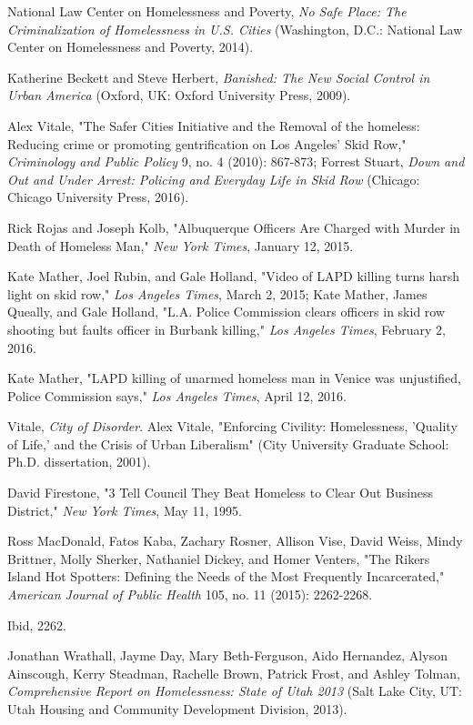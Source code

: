 \documentclass[fontset=fandol, a4paper, 12pt, openright]{ctexbook}
\begin{document}
\begin{enumerate}[label={[\arabic*]}]
    \item National Law Center on Homelessness and Poverty, \textit{No Safe Place: The Criminalization of Homelessness in U.S. Cities} (Washington, D.C.: National Law Center on Homelessness and Poverty, 2014).
    \item Katherine Beckett and Steve Herbert, \textit{Banished: The New Social Control in Urban America} (Oxford, UK: Oxford University Press, 2009).
    \item Alex Vitale, "The Safer Cities Initiative and the Removal of the homeless: Reducing crime or promoting gentrification on Los Angeles' Skid Row," \textit{Criminology and Public Policy} 9, no. 4 (2010): 867-873; Forrest Stuart, \textit{Down and Out and Under Arrest: Policing and Everyday Life in Skid Row} (Chicago: Chicago University Press, 2016).
    \item Rick Rojas and Joseph Kolb, "Albuquerque Officers Are Charged with Murder in Death of Homeless Man," \textit{New York Times}, January 12, 2015.
    \item Kate Mather, Joel Rubin, and Gale Holland, "Video of LAPD killing turns harsh light on skid row," \textit{Los Angeles Times}, March 2, 2015; Kate Mather, James Queally, and Gale Holland, "L.A. Police Commission clears officers in skid row shooting but faults officer in Burbank killing," \textit{Los Angeles Times}, February 2, 2016.
    \item Kate Mather, "LAPD killing of unarmed homeless man in Venice was unjustified, Police Commission says," \textit{Los Angeles Times}, April 12, 2016.
    \item Vitale, \textit{City of Disorder}. Alex Vitale, "Enforcing Civility: Homelessness, 'Quality of Life,' and the Crisis of Urban Liberalism" (City University Graduate School: Ph.D. dissertation, 2001).
    \item David Firestone, "3 Tell Council They Beat Homeless to Clear Out Business District," \textit{New York Times}, May 11, 1995.
    \item Ross MacDonald, Fatos Kaba, Zachary Rosner, Allison Vise, David Weiss, Mindy Brittner, Molly Sherker, Nathaniel Dickey, and Homer Venters, "The Rikers Island Hot Spotters: Defining the Needs of the Most Frequently Incarcerated," \textit{American Journal of Public Health} 105, no. 11 (2015): 2262-2268.
    \item Ibid, 2262.
    \item Jonathan Wrathall, Jayme Day, Mary Beth-Ferguson, Aido Hernandez, Alyson Ainscough, Kerry Steadman, Rachelle Brown, Patrick Frost, and Ashley Tolman, \textit{Comprehensive Report on Homelessness: State of Utah 2013} (Salt Lake City, UT: Utah Housing and Community Development Division, 2013).

\end{enumerate}
\end{document}
